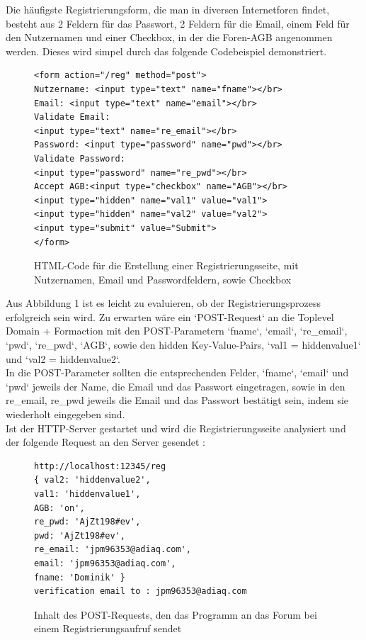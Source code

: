 Die häufigste Registrierungsform, die man in diversen Internetforen findet, besteht aus 2 Feldern für das Passwort, 2 Feldern für die Email, einem Feld für den Nutzernamen und einer Checkbox, in der die Foren-AGB angenommen werden. Dieses wird simpel durch das folgende Codebeispiel demonstriert.


\begin{figure}[h!]
\begin{lstlisting}[language=HTML5]
<form action="/reg" method="post">
Nutzername: <input type="text" name="fname"></br>
Email: <input type="text" name="email"></br>
Validate Email: 
<input type="text" name="re_email"></br>
Password: <input type="password" name="pwd"></br>
Validate Password: 
<input type="password" name="re_pwd"></br>
Accept AGB:<input type="checkbox" name="AGB"></br>
<input type="hidden" name="val1" value="val1">
<input type="hidden" name="val2" value="val2">
<input type="submit" value="Submit">
</form>
\end{lstlisting}
\caption{HTML-Code für die Erstellung einer Registrierungsseite, mit Nutzernamen, Email und Passwordfeldern, sowie Checkbox}
\end{figure}

Aus Abbildung 1 ist es leicht zu evaluieren, ob der Registrierungsprozess erfolgreich sein wird. Zu erwarten wäre ein `POST-Request` an die Toplevel Domain + Formaction mit den POST-Parametern `fname`, `email`, `re\_email`, `pwd`, `re\_pwd`, `AGB`, sowie den hidden Key-Value-Pairs, `val1 = hiddenvalue1` und `val2 = hiddenvalue2`.\\
In die POST-Parameter sollten die entsprechenden Felder, `fname`, `email` und `pwd` jeweils der Name, die Email und das Passwort eingetragen, sowie in den re\_email, re\_pwd jeweils die Email und das Passwort bestätigt sein, indem sie wiederholt eingegeben sind.\\
Ist der HTTP-Server gestartet und wird die Registrierungsseite analysiert und der folgende Request an den Server gesendet :

\begin{figure}[ht]
\begin{lstlisting}[language=HTML5]
http://localhost:12345/reg
{ val2: 'hiddenvalue2',
val1: 'hiddenvalue1',
AGB: 'on',
re_pwd: 'AjZt198#ev',
pwd: 'AjZt198#ev',
re_email: 'jpm96353@adiaq.com',
email: 'jpm96353@adiaq.com',
fname: 'Dominik' }
verification email to : jpm96353@adiaq.com
\end{lstlisting}
\caption{Inhalt des POST-Requests, den das Programm an das Forum bei einem Registrierungsaufruf sendet}
\end{figure}

